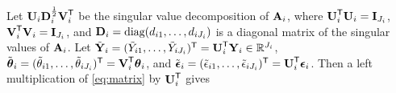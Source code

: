 Let $\M{U}_{i}\M{D}_i^{\frac{1}{2}}\M{V}_{i}\Tra$ be the singular value decomposition of $\M{A}_i$,
where $\M{U}_i\Tra\M{U}_i = \mathbf{I}_{J_i}$, $\M{V}_i\Tra\M{V}_i = \mathbf{I}_{J_i}$,
and $\M{D}_i = \text{diag}(d_{i1},\ldots, d_{iJ_i})$ is a diagonal matrix of the singular values of $\M{A}_i$.
Let $\tilde{\V{y}}_i = (\tilde{Y}_{i1},\ldots, \tilde{Y}_{iJ_i})\Tra= \M{U}_i\Tra\V{y}_i\in \R^{J_i}$, $\tilde{\V{\theta}}_i =
(\tilde{\theta}_{i1},\ldots,\tilde{\theta}_{iJ_i})\Tra = \M{V}_i\Tra\M{\theta}_i$,
and $\tilde{\V{\epsilon}}_i = (\tilde{\epsilon}_{i1},\ldots, \tilde{\epsilon}_{iJ_i})\Tra = \M{U}_i\Tra\M{\epsilon}_i$.
Then a left multiplication of \eqref{eq:matrix}
by $\M{U}_i\Tra$ gives
%
%
%
%
